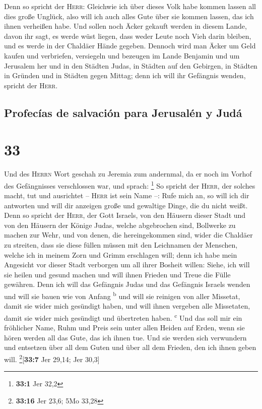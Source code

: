  Denn so spricht der \textsc{Herr}: Gleichwie ich über
dieses Volk habe kommen lassen all dies große Unglück, also will ich
auch alles Gute über sie kommen lassen, das ich ihnen verheißen habe.
 Und sollen noch Äcker gekauft werden in diesem Lande,
davon ihr sagt, es werde wüst liegen, dass weder Leute noch Vieh darin
bleiben, und es werde in der Chaldäer Hände gegeben. 
Dennoch wird man Äcker um Geld kaufen und verbriefen, versiegeln und
bezeugen im Lande Benjamin und um Jerusalem her und in den Städten
Judas, in Städten auf den Gebirgen, in Städten in Gründen und in Städten
gegen Mittag; denn ich will ihr Gefängnis wenden, spricht der
\textsc{Herr}.

\hypertarget{profecuxedas-de-salvaciuxf3n-para-jerusaluxe9n-y-juduxe1}{%
\subsection{Profecías de salvación para Jerusalén y
Judá}\label{profecuxedas-de-salvaciuxf3n-para-jerusaluxe9n-y-juduxe1}}

\hypertarget{section-32}{%
\section{33}\label{section-32}}

 Und des \textsc{Herrn} Wort geschah zu Jeremia zum
andernmal, da er noch im Vorhof des Gefängnisses verschlossen war, und
sprach: \footnote{\textbf{33:1} Jer 32,2}  So spricht der
\textsc{Herr}, der solches macht, tut und ausrichtet -- \textsc{Herr}
ist sein Name --:  Rufe mich an, so will ich dir antworten
und will dir anzeigen große und gewaltige Dinge, die du nicht weißt.
 Denn so spricht der \textsc{Herr}, der Gott Israels, von
den Häusern dieser Stadt und von den Häusern der Könige Judas, welche
abgebrochen sind, Bollwerke zu machen zur Wehr,  und von
denen, die hereingekommen sind, wider die Chaldäer zu streiten, dass sie
diese füllen müssen mit den Leichnamen der Menschen, welche ich in
meinem Zorn und Grimm erschlagen will; denn ich habe mein Angesicht vor
dieser Stadt verborgen um all ihrer Bosheit willen: 
Siehe, ich will sie heilen und gesund machen und will ihnen Frieden und
Treue die Fülle gewähren.  Denn ich will das Gefängnis
Judas und das Gefängnis Israels wenden und will sie bauen wie von Anfang
\textsuperscript{b}  und will sie reinigen von aller
Missetat, damit sie wider mich gesündigt haben, und will ihnen vergeben
alle Missetaten, damit sie wider mich gesündigt und übertreten haben.
\textsuperscript{c}  Und das soll mir ein fröhlicher Name,
Ruhm und Preis sein unter allen Heiden auf Erden, wenn sie hören werden
all das Gute, das ich ihnen tue. Und sie werden sich verwundern und
entsetzen über all dem Guten und über all dem Frieden, den ich ihnen
geben will. \footnote{\textbf{33:16} Jer 23,6; 5Mo 33,28}{[}\textbf{33:7}
Jer 29,14; Jer 30,3{]}

